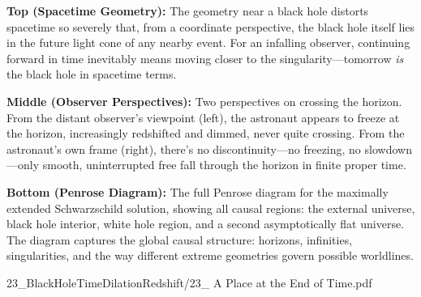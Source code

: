 \begin{SideNotePage}{
  \textbf{Top (Spacetime Geometry):} The geometry near a black hole distorts spacetime so severely that, from a coordinate perspective, the black hole itself lies in the future light cone of any nearby event. For an infalling observer, continuing forward in time inevitably means moving closer to the singularity—tomorrow \textit{is} the black hole in spacetime terms. \par
  \textbf{Middle (Observer Perspectives):} Two perspectives on crossing the horizon. From the distant observer’s viewpoint (left), the astronaut appears to freeze at the horizon, increasingly redshifted and dimmed, never quite crossing. From the astronaut’s own frame (right), there’s no discontinuity—no freezing, no slowdown—only smooth, uninterrupted free fall through the horizon in finite proper time. \par
  \textbf{Bottom (Penrose Diagram):} The full Penrose diagram for the maximally extended Schwarzschild solution, showing all causal regions: the external universe, black hole interior, white hole region, and a second asymptotically flat universe. The diagram captures the global causal structure: horizons, infinities, singularities, and the way different extreme geometries govern possible worldlines.
}{23_BlackHoleTimeDilationRedshift/23_ A Place at the End of Time.pdf}
\end{SideNotePage}
